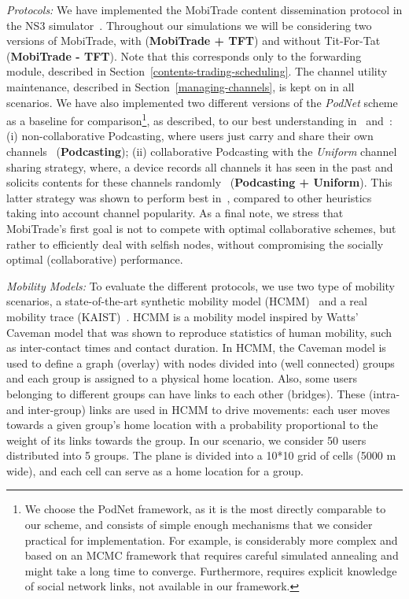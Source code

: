 \emph{Protocols:} We have implemented the MobiTrade content dissemination protocol in the NS3 simulator~\cite{NS3}. Throughout our simulations we will be considering two versions of MobiTrade, with (\textbf{MobiTrade + TFT}) and without Tit-For-Tat (\textbf{MobiTrade - TFT}). Note that this corresponds only to the forwarding module, described in Section~\ref{contents-trading-scheduling}. The channel utility maintenance, described in Section~\ref{managing-channels}, is kept on in all scenarios. We have also implemented two different versions of the \emph{PodNet} scheme as a baseline for comparison\footnote{We choose the PodNet framework, as it is the most directly comparable to our scheme, and consists of simple enough mechanisms that we consider practical for implementation. For example, \cite{OptimalChannelChoice} is considerably more complex and based on an MCMC framework that requires careful simulated annealing and might take a long time to converge. Furthermore, \cite{ContentPlace} requires explicit knowledge of social network links, not available in our framework.},  as described, to our best understanding in~\cite{May07wirelessopportunistic} and~\cite{Podcasting:Secon07}: (i) non-collaborative Podcasting, where users just carry and share their own channels~\cite{May07wirelessopportunistic} (\textbf{Podcasting}); (ii) collaborative Podcasting with the \emph{Uniform} channel sharing strategy, where, a device records all channels it has seen in the past and solicits contents for these channels randomly~\cite{Podcasting:Secon07} (\textbf{Podcasting + Uniform}). This latter strategy was shown to perform best in~\cite{Podcasting:Secon07}, compared to other heuristics taking into account channel popularity. As a final note, we stress that MobiTrade's first goal is not to compete with optimal collaborative schemes, but rather to efficiently deal with selfish nodes, without compromising the socially optimal (collaborative) performance.

\emph{Mobility Models:} To evaluate the different protocols, we use two type of mobility scenarios, a state-of-the-art synthetic mobility model (HCMM)~\cite{HCMM} and a real mobility trace (KAIST)~\cite{KAIST}. HCMM is a mobility model inspired by Watts' Caveman model that was shown to reproduce statistics of human mobility, such as inter-contact times and contact duration. In HCMM, the Caveman model is used to define a graph (overlay) with nodes divided into (well connected) groups and each group is assigned to a physical home location. Also, some users belonging to different groups can have links to each other (bridges). These (intra- and inter-group) links are used in HCMM to drive movements: each user moves towards a given group's home location with a probability
proportional to the weight of its links towards the group. In our scenario, we consider 50 users distributed into 5 groups. The plane is divided into a 10*10 grid of cells (5000 m wide), and each cell can serve as a home location for a group.

